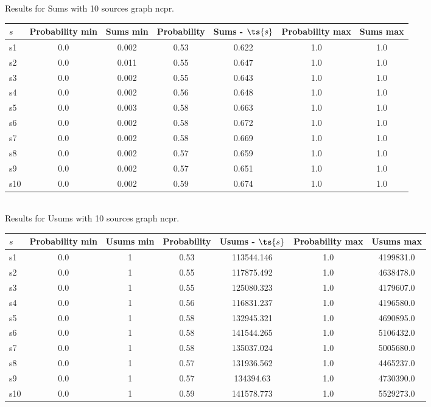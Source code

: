 \documentclass{article}
\begin{document}
\noindent Results for Sums with 10 sources graph ncpr.

\noindent\begin{tabular}{|l|c|c|c|c|c|c|}
\hline
$s$& Probability min & Sums min & Probability & Sums - $\ts{s}$ & Probability max & Sums max\\
\hline
s1 &0.0 & 0.002 & 0.53 & 0.622 & 1.0 & 1.0\\
\hline
s2 &0.0 & 0.011 & 0.55 & 0.647 & 1.0 & 1.0\\
\hline
s3 &0.0 & 0.002 & 0.55 & 0.643 & 1.0 & 1.0\\
\hline
s4 &0.0 & 0.002 & 0.56 & 0.648 & 1.0 & 1.0\\
\hline
s5 &0.0 & 0.003 & 0.58 & 0.663 & 1.0 & 1.0\\
\hline
s6 &0.0 & 0.002 & 0.58 & 0.672 & 1.0 & 1.0\\
\hline
s7 &0.0 & 0.002 & 0.58 & 0.669 & 1.0 & 1.0\\
\hline
s8 &0.0 & 0.002 & 0.57 & 0.659 & 1.0 & 1.0\\
\hline
s9 &0.0 & 0.002 & 0.57 & 0.651 & 1.0 & 1.0\\
\hline
s10 &0.0 & 0.002 & 0.59 & 0.674 & 1.0 & 1.0\\
\hline
\end{tabular}\\

\noindent Results for Usums with 10 sources graph ncpr.

\noindent\begin{tabular}{|l|c|c|c|c|c|c|}
\hline
$s$& Probability min & Usums min & Probability & Usums - $\ts{s}$ & Probability max & Usums max\\
\hline
s1 &0.0 & 1 & 0.53 & 113544.146 & 1.0 & 4199831.0\\
\hline
s2 &0.0 & 1 & 0.55 & 117875.492 & 1.0 & 4638478.0\\
\hline
s3 &0.0 & 1 & 0.55 & 125080.323 & 1.0 & 4179607.0\\
\hline
s4 &0.0 & 1 & 0.56 & 116831.237 & 1.0 & 4196580.0\\
\hline
s5 &0.0 & 1 & 0.58 & 132945.321 & 1.0 & 4690895.0\\
\hline
s6 &0.0 & 1 & 0.58 & 141544.265 & 1.0 & 5106432.0\\
\hline
s7 &0.0 & 1 & 0.58 & 135037.024 & 1.0 & 5005680.0\\
\hline
s8 &0.0 & 1 & 0.57 & 131936.562 & 1.0 & 4465237.0\\
\hline
s9 &0.0 & 1 & 0.57 & 134394.63 & 1.0 & 4730390.0\\
\hline
s10 &0.0 & 1 & 0.59 & 141578.773 & 1.0 & 5529273.0\\
\hline
\end{tabular}\\
\end{document}
